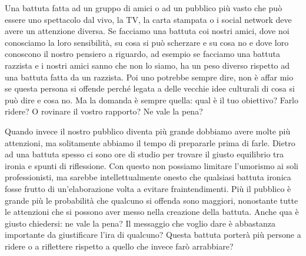 \documentclass[12pt]{book} %
\begin{document}
\begin{mdframed}[linewidth=1pt]
\bigskip

Una battuta fatta ad un gruppo di amici o ad un pubblico più vasto che può essere uno spettacolo dal vivo, la TV, la
carta stampata o i social network deve avere un attenzione diversa. Se facciamo una battuta coi nostri amici, dove noi
conosciamo la loro sensibilità, su cosa si può scherzare e su cosa no e dove loro conoscono il nostro pensiero a
riguardo, ad esempio se facciamo una battuta razzista e i nostri amici sanno che non lo siamo, ha un peso diverso
rispetto ad una battuta fatta da un razzista. Poi uno potrebbe sempre dire, non è affar mio se questa persona si
offende perché legata a delle vecchie idee culturali di cosa si può dire e cosa no. Ma la domanda è sempre quella: qual
è il tuo obiettivo? Farlo ridere? O rovinare il vostro rapporto? Ne vale la pena?


\bigskip

Quando invece il nostro pubblico diventa più grande dobbiamo avere molte più attenzioni, ma solitamente abbiamo il tempo
di prepararle prima di farle. Dietro ad una battuta spesso ci sono ore di studio per trovare il giusto equilibrio tra
ironia e spunti di riflessione. Con questo non possiamo limitare l'umorismo ai soli
professionisti, ma sarebbe intellettualmente onesto che qualsiasi battuta ironica fosse frutto di
un'elaborazione volta a evitare fraintendimenti. Più il pubblico è grande più le probabilità che
qualcuno si offenda sono maggiori, nonostante tutte le attenzioni che si possono aver messo nella creazione della
battuta. Anche qua è giusto chiedersi: ne vale la pena? Il messaggio che voglio dare è abbastanza importante da
giustificare l'ira di qualcuno? Questa battuta porterà più persone a ridere o a riflettere
rispetto a quello che invece farò arrabbiare?


\end{mdframed}
\end{document}
